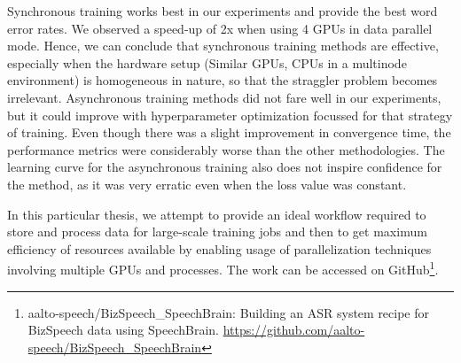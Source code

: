 Synchronous training works best in our experiments and provide the best word error rates. We observed a speed-up of 2x when using 4 GPUs in data parallel mode. Hence, we can conclude that synchronous training methods are effective, especially when the hardware setup (Similar GPUs, CPUs in a multinode environment) is homogeneous in nature, so that the straggler problem becomes irrelevant. Asynchronous training methods did not fare well in our experiments, but it could improve with hyperparameter optimization focussed for that strategy of training.  Even though there was a slight improvement in convergence time, the performance metrics were considerably worse than the other methodologies. The learning curve for the asynchronous training also does not inspire confidence for the method, as it was very erratic even when the loss value was constant. 

In this particular thesis, we attempt to provide an ideal workflow required to store and process data for large-scale training jobs and then to get maximum efficiency of resources available by enabling usage of parallelization techniques involving multiple GPUs and processes. The work can be accessed on GitHub\footnote{aalto-speech/BizSpeech\_SpeechBrain: Building an ASR system recipe for BizSpeech data using SpeechBrain. \href{https://github.com/aalto-speech/BizSpeech_SpeechBrain}{https://github.com/aalto-speech/BizSpeech\_SpeechBrain}}.